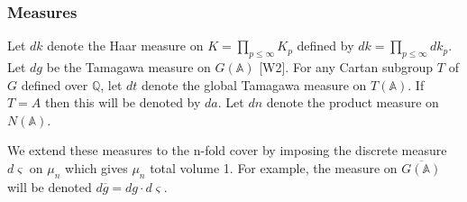 \documentclass[12pt]{article}
\def\aaa{\mathbb{A}}
\def\qqq{\mathbb{Q}}
\begin{document}
\subsubsection{Measures}

Let $dk$ denote the Haar measure on $K=\prod_{p\leq \infty }K_p$
defined by $dk=\prod_{p\leq \infty }dk_p$.
Let $dg$ be the Tamagawa measure on
$G(\aaa )$ [W2]. For any Cartan subgroup
$T$ of $G$ defined over $\qqq$, let $dt$
denote the global Tamagawa measure on $T(\aaa )$. If $T=A$ then this will
be denoted by $da$. Let $dn$ denote the product measure on $N(\aaa )$.

We extend these measures to the n-fold cover by imposing the discrete
measure $d\varsigma $ on $\mu _n$ which gives $\mu _n$ total volume 1. For
example, the measure on $\overline{G(\aaa )}$ will be denoted
$d\overline{g}=dg\cdot d\varsigma $.










\printindex
\end{document}
